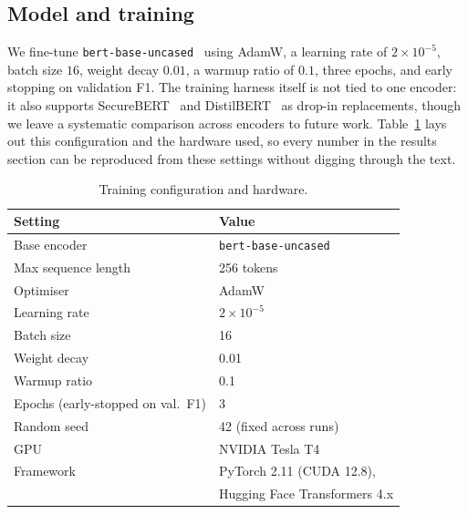 \documentclass[conference]{IEEEtran}
\begin{document}
\subsection{Model and training}
We fine-tune \texttt{bert-base-uncased}~\cite{devlin2019bert} using
AdamW, a learning rate of $2{\times}10^{-5}$, batch size $16$, weight
decay $0.01$, a warmup ratio of $0.1$, three epochs, and early stopping
on validation F1. The training harness itself is not tied to one
encoder: it also supports SecureBERT~\cite{aghaei2022securebert,aghaei2025securebert2}
and DistilBERT~\cite{sanh2019distilbert} as drop-in replacements, though
we leave a systematic comparison across encoders to future work.
Table~\ref{tab:hyperparams} lays out this configuration and the hardware
used, so every number in the results section can be reproduced from
these settings without digging through the text.

\begin{table}[t]
\centering
\caption{Training configuration and hardware.}
\label{tab:hyperparams}
\begin{tabular}{@{}ll@{}}
\toprule
Setting & Value \\
\midrule
Base encoder & \texttt{bert-base-uncased} \\
Max sequence length & 256 tokens \\
Optimiser & AdamW \\
Learning rate & $2\times10^{-5}$ \\
Batch size & 16 \\
Weight decay & 0.01 \\
Warmup ratio & 0.1 \\
Epochs (early-stopped on val.\ F1) & 3 \\
Random seed & 42 (fixed across runs) \\
GPU & NVIDIA Tesla T4 \\
Framework & PyTorch 2.11 (CUDA 12.8), \\
 & Hugging Face Transformers 4.x \\
\bottomrule
\end{tabular}
\end{table}
\end{document}
